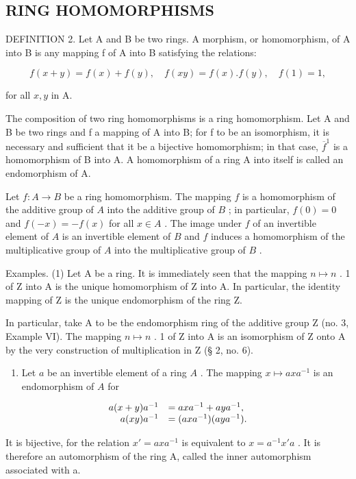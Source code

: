 \subsection{RING HOMOMORPHISMS}

DEFINITION 2. Let A and B be two rings. A morphism, or homomorphism, of A into B is any mapping f of A into B satisfying the relations:

\[
f (x + y) = f (x) + f (y), \quad f (x y) = f (x). f (y), \quad f (1) = 1,\tag{17}
\]

for all \(x, y\) in A.

The composition of two ring homomorphisms is a ring homomorphism. Let A and B be two rings and f a mapping of A into B; for f to be an isomorphism, it is necessary and sufficient that it be a bijective homomorphism; in that case, \(\overline{f}^{1}\) is a homomorphism of B into A. A homomorphism of a ring A into itself is called an endomorphism of A.

Let \(f: A \to B\) be a ring homomorphism. The mapping \(f\) is a homomorphism of the additive group of \(A\) into the additive group of \(B\) ; in particular, \(f(0) = 0\) and \(f(-x) = -f(x)\) for all \(x \in A\) . The image under \(f\) of an invertible element of \(A\) is an invertible element of \(B\) and \(f\) induces a homomorphism of the multiplicative group of \(A\) into the multiplicative group of \(B\) .

Examples. (1) Let A be a ring. It is immediately seen that the mapping \(n \mapsto n\) . 1 of Z into A is the unique homomorphism of Z into A. In particular, the identity mapping of Z is the unique endomorphism of the ring Z.

In particular, take A to be the endomorphism ring of the additive group Z (no. 3, Example VI). The mapping \(n \mapsto n\) . 1 of Z into A is an isomorphism of Z onto A by the very construction of multiplication in Z (§ 2, no. 6).

\begin{enumerate}
\def\labelenumi{(\arabic{enumi})}
\setcounter{enumi}{1}
\tightlist
\item
  Let \(a\) be an invertible element of a ring \(A\) . The mapping \(x \mapsto axa^{-1}\) is an endomorphism of \(A\) for
\end{enumerate}

\[
\begin{array}{r l} a (x + y) a ^ {- 1} & = a x a ^ {- 1} + a y a ^ {- 1}, \\ a (x y) a ^ {- 1} & = (a x a ^ {- 1}) (a y a ^ {- 1}). \end{array}
\]

It is bijective, for the relation \(x' = axa^{-1}\) is equivalent to \(x = a^{-1}x'a\) . It is therefore an automorphism of the ring A, called the inner automorphism associated with a.

